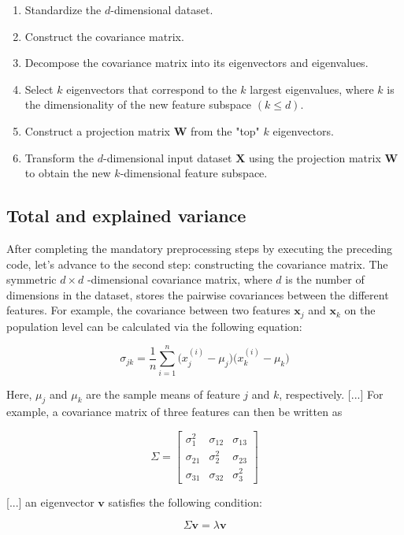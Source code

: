 \documentclass[letterpaper]{report}
\begin{document}
\begin{enumerate}
\item Standardize the $d$-dimensional dataset.
\item Construct the covariance matrix.
\item Decompose the covariance matrix into its eigenvectors and eigenvalues.
\item Select $k$ eigenvectors that correspond to the $k$ largest eigenvalues, where $k$ is the dimensionality of the new feature subspace $(k \le d)$.
\item Construct a projection matrix $\mathbf{W}$ from the "top" $k$ eigenvectors.
\item Transform the $d$-dimensional input dataset $\mathbf{X}$ using the projection matrix $\mathbf{W}$ to obtain the new $k$-dimensional feature subspace.
\end{enumerate}

\subsection{Total and explained variance}

After completing the mandatory preprocessing steps by executing the preceding code, let's advance to the second step: constructing the covariance matrix. The symmetric $d \times d$ -dimensional covariance matrix, where $d$ is the number of dimensions in the dataset, stores the pairwise covariances between the different features. For example, the covariance between two features $\mathbf{x}_j$ and $\mathbf{x}_k$ on the population level can be calculated via the following equation:

\[
\sigma_{jk} = \frac{1}{n} \sum_{i=1}^{n} \big(  x_{j}^{(i)} - \mu_j  \big) \big(  x_{k}^{(i)}  - \mu_k \big)
\]

Here, $\mu_j$ and $\mu_k$ are the sample means of feature $j$ and $k$, respectively. [...] For example, a covariance matrix of three features can then be written as 

\[
\Sigma = \begin{bmatrix}
\sigma_{1}^2 & \sigma_{12} & \sigma_{13} \\
\sigma_{21} & \sigma_{2}^{2} & \sigma_{23} \\
\sigma_{31} & \sigma_{32} & \sigma_{3}^{2}
\end{bmatrix}
\]

[...] an eigenvector $\mathbf{v}$ satisfies the following condition:

\[
\Sigma \mathbf{v} = \lambda \mathbf{v}
\]
\end{document}
